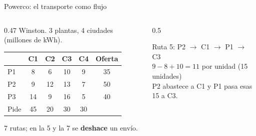 \documentclass[aspectratio=169]{beamer}
\newcommand{\ra}{\ensuremath{\to}}
\begin{document}
\begin{frame}{Powerco: el transporte como flujo}
  \begin{columns}[c]
    \begin{column}{0.47\textwidth}
      \small Winston. 3 plantas, 4 ciudades (millones de kWh).
      \medskip

      \begin{tabular}{lccccc}
        \toprule
         & C1 & C2 & C3 & C4 & Oferta \\
        \midrule
        P1 & 8 & 6 & 10 & 9 & 35 \\
        P2 & 9 & 12 & 13 & 7 & 50 \\
        P3 & 14 & 9 & 16 & 5 & 40 \\
        \midrule
        Pide & 45 & 20 & 30 & 30 & \\
        \bottomrule
      \end{tabular}
      \medskip

      7 rutas; en la 5 y la 7 se \textbf{deshace} un envío.
      \medskip

      \centering {}
    \end{column}
    \begin{column}{0.5\textwidth}\centering

      \small Ruta 5: P2 \ra{} C1 \ra{} P1 \ra{} C3\\
      $9 - 8 + 10 = 11$ por unidad (15 unidades)\\[2pt]
      P2 abastece a C1 y P1 pasa esas 15 a C3.
    \end{column}
  \end{columns}
\end{frame}
\end{document}
